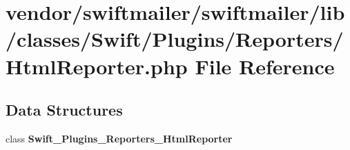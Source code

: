 \section{vendor/swiftmailer/swiftmailer/lib/classes/\+Swift/\+Plugins/\+Reporters/\+Html\+Reporter.php File Reference}
\label{_html_reporter_8php}
\subsection*{Data Structures}
\begin{DoxyCompactItemize}
\item 
class {\bf Swift\+\_\+\+Plugins\+\_\+\+Reporters\+\_\+\+Html\+Reporter}
\end{DoxyCompactItemize}
